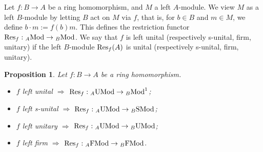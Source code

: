 \documentclass[12pt]{amsart}
\newtheorem{prop}[thm]{Proposition}
\theoremstyle{definition}
\newcommand{\Mod}{{\rm Mod}}
\newcommand{\FMod}{{\rm FMod}}
\newcommand{\SMod}{{\rm SMod}}
\newcommand{\UMod}{{\rm UMod}}
\newcommand{\Res}{{\rm Res}}
\begin{document}
Let $f : B \to A$ be a ring
homomorphism, and $M$ a left $A$-module.
We view $M$ as a left $B$-module by 
letting $B$ act on $M$ via $f$, that is, 
for \(b \in B\) and \(m \in M\),
we define $b \cdot m := f(b)m$.
This defines the
restriction functor
$\Res_f : {}_A \Mod \to {}_B \Mod$.
We say that 
$f$ is left unital (respectively 
s-unital, firm, unitary) 
if the left $B$-module
$\Res_f(A)$ is unital 
(respectively s-unital, firm, unitary).

\begin{prop}
Let $f : B \to A$ be a ring homomorphism. 
\begin{itemize}[widest=(a)]

\item[{\rm (a)}] $f$ left unital
$\Longrightarrow$
$\Res_f : {}_A \UMod \to {}_B \Mod^1$;

\item[{\rm (b)}] $f$ left s-unital
$\Longrightarrow$
$\Res_f : {}_A \UMod \to {}_B\SMod$;

\item[{\rm (c)}] $f$ left unitary 
$\Longrightarrow$
$\Res_f : {}_A \UMod \to {}_B\UMod$;

\item[{\rm (d)}] $f$ left firm 
$\Longrightarrow$
$\Res_f : {}_A \FMod \to {}_B\FMod$.

\end{itemize}
\end{prop}
\end{document}
